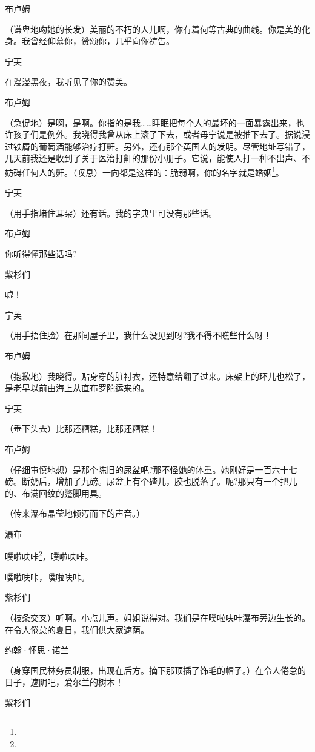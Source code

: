 \par 布卢姆
\par （谦卑地吻她的长发）美丽的不朽的人儿啊，你有着何等古典的曲线。你是美的化身。我曾经仰慕你，赞颂你，几乎向你祷告。
\par 宁芙
\par 在漫漫黑夜，我听见了你的赞美。
\par 布卢姆
\par （急促地）是啊，是啊。你指的是我……睡眠把每个人的最坏的一面暴露出来，也许孩子们是例外。我晓得我曾从床上滚了下去，或者毋宁说是被推下去了。据说浸过铁屑的葡萄酒能够治疗打鼾。另外，还有那个英国人的发明。尽管地址写错了，几天前我还是收到了关于医治打鼾的那份小册子。它说，能使人打一种不出声、不妨碍任何人的鼾。（叹息）一向都是这样的：脆弱啊，你的名字就是婚姻\footnote{}。
\par 宁芙
\par （用手指堵住耳朵）还有话。我的字典里可没有那些话。
\par 布卢姆
\par 你听得懂那些话吗?
\par 紫杉们
\par 嘘！
\par 宁芙
\par （用手捂住脸）在那间屋子里，我什么没见到呀?我不得不瞧些什么呀！
\par 布卢姆
\par （抱歉地）我晓得。贴身穿的脏衬衣，还特意给翻了过来。床架上的环儿也松了，是老早以前由海上从直布罗陀运来的。
\par 宁芙
\par （垂下头去）比那还糟糕，比那还糟糕！
\par 布卢姆
\par （仔细审慎地想）是那个陈旧的尿盆吧?那不怪她的体重。她刚好是一百六十七磅。断奶后，增加了九磅。尿盆上有个碴儿，胶也脱落了。呃?那只有一个把儿的、布满回纹的蹩脚用具。
\par （传来瀑布晶莹地倾泻而下的声音。）
\par 瀑布
\par 噗啦呋咔\footnote{}，噗啦呋咔。
\par 噗啦呋咔，噗啦呋咔。
\par 紫杉们
\par （枝条交叉）听啊。小点儿声。姐姐说得对。我们是在噗啦呋咔瀑布旁边生长的。在令人倦怠的夏日，我们供大家遮荫。
\par 约翰·怀思·诺兰
\par （身穿国民林务员制服，出现在后方。摘下那顶插了饰毛的帽子。）在令人倦怠的日子，遮阴吧，爱尔兰的树木！
\par 紫杉们
